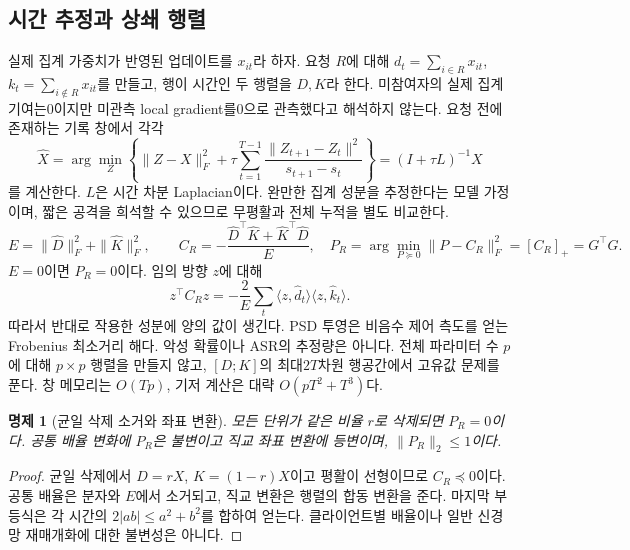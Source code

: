 \documentclass[10pt,a4paper]{article}
\newtheorem{proposition}{명제}
\begin{document}
\subsection{시간 추정과 상쇄 행렬}
실제 집계 가중치가 반영된 업데이트를 $x_{it}$라 하자. 요청 $R$에 대해
$d_t=\sum_{i\in R}x_{it}$, $k_t=\sum_{i\notin R}x_{it}$를 만들고,
행이 시간인 두 행렬을 $D,K$라 한다. 미참여자의 실제 집계 기여는0이지만
미관측 local gradient를0으로 관측했다고 해석하지 않는다.
요청 전에 존재하는 기록 창에서 각각
\begin{equation}
\widehat X=\arg\min_Z\left\{\|Z-X\|_F^2+
\tau\sum_{t=1}^{T-1}\frac{\|Z_{t+1}-Z_t\|^2}{s_{t+1}-s_t}\right\}
=(I+\tau L)^{-1}X
\end{equation}
를 계산한다. $L$은 시간 차분 Laplacian이다. 완만한 집계 성분을 추정한다는
모델 가정이며, 짧은 공격을 희석할 수 있으므로 무평활과 전체 누적을 별도 비교한다.
\begin{equation}
E=\|\widehat D\|_F^2+\|\widehat K\|_F^2,\qquad
C_R=-\frac{\widehat D^\top\widehat K+\widehat K^\top\widehat D}{E},
\quad P_R=\arg\min_{P\succeq0}\|P-C_R\|_F^2=[C_R]_+=G^\top G .
\end{equation}
$E=0$이면 $P_R=0$이다. 임의 방향 $z$에 대해
\begin{equation}
z^\top C_Rz=-\frac{2}{E}\sum_t
\langle z,\hat d_t\rangle\langle z,\hat k_t\rangle .
\end{equation}
따라서 반대로 작용한 성분에 양의 값이 생긴다. PSD 투영은 비음수 제어
측도를 얻는 Frobenius 최소거리 해다. 악성 확률이나 ASR의 추정량은 아니다.
전체 파라미터 수 $p$에 대해 $p\times p$ 행렬을 만들지 않고,
$[D;K]$의 최대$2T$차원 행공간에서 고유값 문제를 푼다.
창 메모리는 $O(Tp)$, 기저 계산은 대략 $O(pT^2+T^3)$다.

\begin{proposition}[균일 삭제 소거와 좌표 변환]
모든 단위가 같은 비율 $r$로 삭제되면 $P_R=0$이다.
공통 배율 변화에 $P_R$은 불변이고 직교 좌표 변환에 등변이며,
$\|P_R\|_2\le1$이다.
\end{proposition}
\begin{proof}
균일 삭제에서 $D=rX$, $K=(1-r)X$이고 평활이 선형이므로 $C_R\preceq0$이다.
공통 배율은 분자와 $E$에서 소거되고, 직교 변환은 행렬의 합동 변환을 준다.
마지막 부등식은 각 시간의 $2|ab|\le a^2+b^2$를 합하여 얻는다.
클라이언트별 배율이나 일반 신경망 재매개화에 대한 불변성은 아니다.
\end{proof}
\end{document}
